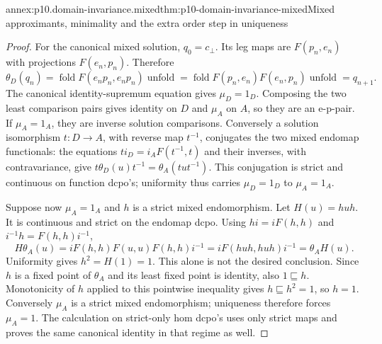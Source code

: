 \begin{annexitem}{annex:p10.domain-invariance.mixed}{thm:p10-domain-invariance-mixed}{Mixed approximants, minimality and the extra order step in uniqueness}
\begin{proof}
For the canonical mixed solution, \(q_0=c_{\bot}\). Its leg
maps are \(F(p_n,e_n)\) with projections \(F(e_n,p_n)\).
Therefore
\[
 \theta_D(q_n)=\operatorname{fold}F(e_np_n,e_np_n)
                     \operatorname{unfold}
 =\operatorname{fold}F(p_n,e_n)F(e_n,p_n)
                     \operatorname{unfold}=q_{n+1}.
\]
The canonical identity-supremum equation gives \(\mu_D=1_D\).
Composing the two least comparison pairs gives identity on \(D\)
and \(\mu_A\) on \(A\), so they are an e-p-pair. If
\(\mu_A=1_A\), they are inverse solution comparisons.
Conversely a solution isomorphism \(t:D\to A\), with reverse
map \(t^{-1}\), conjugates the two mixed endomap functionals:
the equations \(ti_D=i_AF(t^{-1},t)\) and their inverses,
with contravariance, give
\(t\theta_D(u)t^{-1}=\theta_A(tut^{-1})\).
This conjugation is strict and continuous on function dcpo's;
uniformity thus carries \(\mu_D=1_D\) to \(\mu_A=1_A\).

Suppose now \(\mu_A=1_A\) and \(h\) is a strict mixed
endomorphism. Let \(H(u)=huh\). It is continuous and strict
on the endomap dcpo. Using
\(hi=iF(h,h)\) and \(i^{-1}h=F(h,h)i^{-1}\),
\[
 H\theta_A(u)=iF(h,h)F(u,u)F(h,h)i^{-1}
             =iF(huh,huh)i^{-1}=\theta_AH(u).
\]
Uniformity gives \(h^2=H(1)=1\). This alone is not the
desired conclusion. Since \(h\) is a fixed point of
\(\theta_A\) and its least fixed point is identity, also
\(1\sqsubseteq h\). Monotonicity of \(h\) applied to this
pointwise inequality gives \(h\sqsubseteq h^2=1\), so
\(h=1\). Conversely \(\mu_A\) is a strict mixed
endomorphism; uniqueness therefore forces \(\mu_A=1\).
The calculation on strict-only hom dcpo's uses only strict maps
and proves the same canonical identity in that regime as well.
\end{proof}
\end{annexitem}

